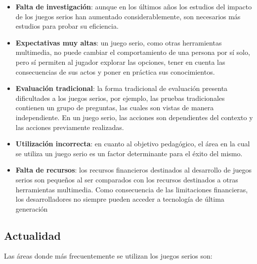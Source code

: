 \begin{itemize}

\item \textbf{Falta de investigación}: aunque en los últimos años los estudios
    del impacto de los juegos serios han aumentado considerablemente, son
    necesarios más estudios para probar su eficiencia\cite{sg:aoverview}.

\item \textbf{Expectativas muy altas}: un juego serio, como otras herramientas
    multimedia, no puede cambiar el comportamiento de una persona por sí solo,
    pero sí permiten al jugador explorar las opciones, tener en cuenta las
    consecuencias de sus actos y poner en práctica sus
    conocimientos\cite{education:games,stapleton2004serious,videojuegos:gonzaleztardon}. 

\item \textbf{Evaluación tradicional}: la forma tradicional de evaluación
    presenta dificultades a los juegos serios, por ejemplo, las pruebas
    tradicionales contienen un grupo de preguntas, las cuales son vistas de
    manera independiente. En un juego serio, las acciones son dependientes del
    contexto y las acciones previamente realizadas\cite{shute2009melding}.

\item \textbf{Utilización incorrecta}: en cuanto al objetivo pedagógico, el área
    en la cual se utiliza un juego serio es un factor determinante para el éxito
    del mismo\cite{stapleton2004serious}.

\item \textbf{Falta de recursos}: los recursos financieros destinados al
    desarrollo de juegos serios son pequeños al ser comparados con los recursos
    destinados a otras herramientas
    multimedia\cite{stapleton2004serious,sg:aoverview}. Como consecuencia de las
    limitaciones financieras, los desarrolladores no siempre pueden acceder a
    tecnología de última generación\cite{stapleton2004serious}

\end{itemize}

\subsection{Actualidad}

Las áreas donde más frecuentemente se utilizan los juegos serios son:

